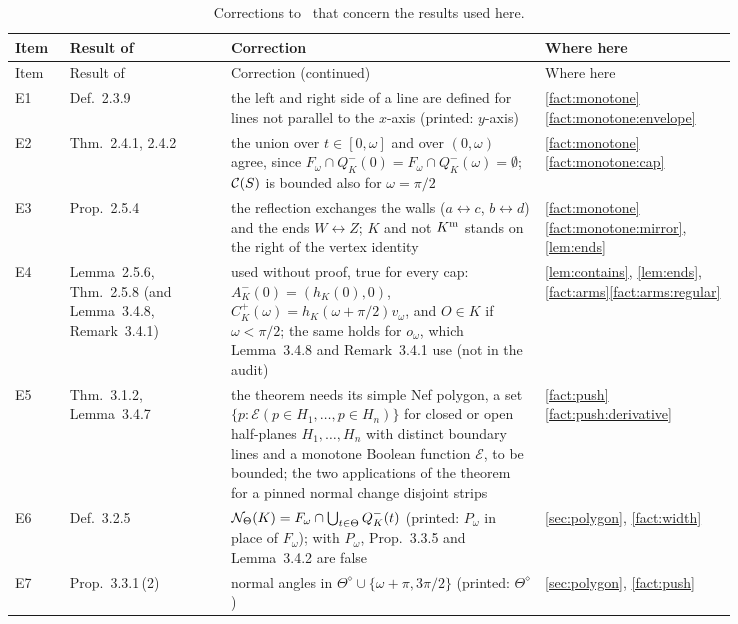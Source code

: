 {\small
\begin{longtable}{@{}>{\raggedright\arraybackslash}p{0.065\linewidth}>{\raggedright\arraybackslash}p{0.19\linewidth}>{\raggedright\arraybackslash}p{0.37\linewidth}>{\raggedright\arraybackslash}p{0.22\linewidth}@{}}
\caption{Corrections to~\cite{Baek} that concern the results used here.}\label{tab:corrections}\\
\toprule
Item & Result of~\cite{Baek} & Correction & Where here\\
\midrule\endfirsthead
\toprule
Item & Result of~\cite{Baek} & Correction (continued) & Where here\\
\midrule\endhead
\bottomrule\endlastfoot
E1 & Def.~2.3.9 & the left and right side of a line are defined for lines not parallel to the $x$-axis (printed: $y$-axis) & \cref{fact:monotone}\ref{fact:monotone:envelope}\\
E2 & Thm.~2.4.1, 2.4.2 & the union over $t\in[0,\omega]$ and over $(0,\omega)$ agree, since $F_\omega\cap Q^-_K(0)=F_\omega\cap Q^-_K(\omega)=\emptyset$; $\mathcal{C}(S)$ is bounded also for $\omega=\pi/2$ & \cref{fact:monotone}\ref{fact:monotone:cap}\\
E3 & Prop.~2.5.4 & the reflection exchanges the walls ($a\leftrightarrow c$, $b\leftrightarrow d$) and the ends $W\leftrightarrow Z$; $K$ and not $K^{\mathrm{m}}$ stands on the right of the vertex identity & \cref{fact:monotone}\ref{fact:monotone:mirror}, \cref{lem:ends}\\
E4 & Lemma~2.5.6, Thm.~2.5.8 (and Lemma~3.4.8, Remark~3.4.1) & used without proof, true for every cap: $A_K^-(0)=(h_K(0),0)$, $C_K^+(\omega)=h_K(\omega+\pi/2)v_\omega$, and $O\in K$ if $\omega<\pi/2$; the same holds for $o_\omega$, which Lemma~3.4.8 and Remark~3.4.1 use (not in the audit) & \cref{lem:contains}, \cref{lem:ends}, \cref{fact:arms}\ref{fact:arms:regular}\\
E5 & Thm.~3.1.2, Lemma~3.4.7 & the theorem needs its simple Nef polygon, a set $\{p:\mathcal E(p\in H_1,\dots,p\in H_n)\}$ for closed or open half-planes $H_1,\dots,H_n$ with distinct boundary lines and a monotone Boolean function $\mathcal E$, to be bounded; the two applications of the theorem for a pinned normal change disjoint strips & \cref{fact:push}\ref{fact:push:derivative}\\
E6 & Def.~3.2.5 & $\mathcal{N}_\Theta(K)=F_\omega\cap\bigcup_{t\in\Theta}Q^-_K(t)$ (printed: $P_\omega$ in place of $F_\omega$); with $P_\omega$, Prop.~3.3.5 and Lemma~3.4.2 are false & \cref{sec:polygon}, \cref{fact:width}\\
E7 & Prop.~3.3.1\,(2) & normal angles in $\Theta^\diamond\cup\{\omega+\pi,3\pi/2\}$ (printed: $\Theta^\diamond$) & \cref{sec:polygon}, \cref{fact:push}\\

\end{longtable}}
